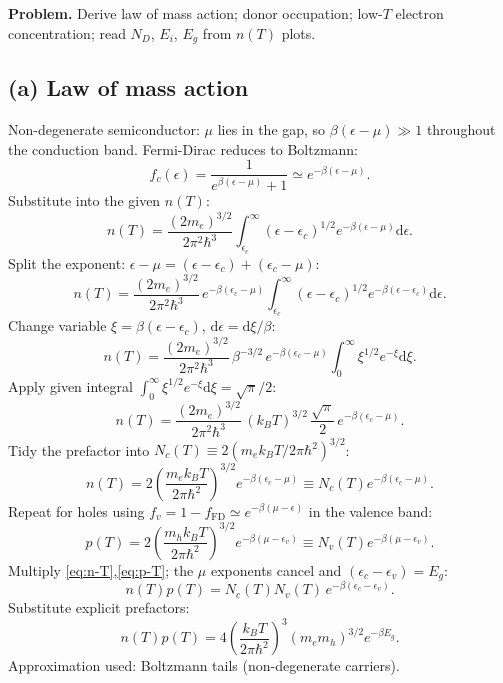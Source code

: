 \documentclass[11pt]{article}
\newcommand{\de}{\mathrm{d}}
\begin{document}
\textbf{Problem.} Derive law of mass action; donor occupation; low-$T$ electron concentration; read $N_D$, $E_i$, $E_g$ from $n(T)$ plots.

\subsection*{(a) Law of mass action}

Non-degenerate semiconductor: $\mu$ lies in the gap, so $\beta(\epsilon-\mu)\gg 1$ throughout the conduction band. Fermi-Dirac reduces to Boltzmann:
\[ f_c(\epsilon)=\frac{1}{e^{\beta(\epsilon-\mu)}+1}\simeq e^{-\beta(\epsilon-\mu)}. \]
Substitute into the given $n(T)$:
\[ n(T)=\frac{(2m_e)^{3/2}}{2\pi^2\hbar^3}\int_{\epsilon_c}^\infty(\epsilon-\epsilon_c)^{1/2}e^{-\beta(\epsilon-\mu)}\de\epsilon. \]
Split the exponent: $\epsilon-\mu=(\epsilon-\epsilon_c)+(\epsilon_c-\mu)$:
\[ n(T)=\frac{(2m_e)^{3/2}}{2\pi^2\hbar^3}\,e^{-\beta(\epsilon_c-\mu)}\int_{\epsilon_c}^\infty(\epsilon-\epsilon_c)^{1/2}e^{-\beta(\epsilon-\epsilon_c)}\de\epsilon. \]
Change variable $\xi=\beta(\epsilon-\epsilon_c)$, $\de\epsilon=\de\xi/\beta$:
\[ n(T)=\frac{(2m_e)^{3/2}}{2\pi^2\hbar^3}\,\beta^{-3/2}\,e^{-\beta(\epsilon_c-\mu)}\int_0^\infty\xi^{1/2}e^{-\xi}\de\xi. \]
Apply given integral $\int_0^\infty\xi^{1/2}e^{-\xi}\de\xi=\sqrt\pi/2$:
\[ n(T)=\frac{(2m_e)^{3/2}}{2\pi^2\hbar^3}\,(k_B T)^{3/2}\,\frac{\sqrt\pi}{2}\,e^{-\beta(\epsilon_c-\mu)}. \]
Tidy the prefactor into $N_c(T)\equiv 2(m_e k_B T/2\pi\hbar^2)^{3/2}$:
\begin{equation}
n(T)=2\!\left(\frac{m_e k_B T}{2\pi\hbar^2}\right)^{\!3/2}\!e^{-\beta(\epsilon_c-\mu)}\equiv N_c(T)e^{-\beta(\epsilon_c-\mu)}.
\label{eq:n-T}
\end{equation}
Repeat for holes using $f_v=1-f_{\text{FD}}\simeq e^{-\beta(\mu-\epsilon)}$ in the valence band:
\begin{equation}
p(T)=2\!\left(\frac{m_h k_B T}{2\pi\hbar^2}\right)^{\!3/2}\!e^{-\beta(\mu-\epsilon_v)}\equiv N_v(T)e^{-\beta(\mu-\epsilon_v)}.
\label{eq:p-T}
\end{equation}
Multiply \eqref{eq:n-T},\eqref{eq:p-T}; the $\mu$ exponents cancel and $(\epsilon_c-\epsilon_v)=E_g$:
\[ n(T)p(T)=N_c(T)N_v(T)\,e^{-\beta(\epsilon_c-\epsilon_v)}. \]
Substitute explicit prefactors:
\begin{equation}
\boxed{\;n(T)p(T)=4\!\left(\frac{k_B T}{2\pi\hbar^2}\right)^{\!3}\!(m_e m_h)^{3/2}e^{-\beta E_g}.\;}
\label{eq:mass-action}
\end{equation}
Approximation used: Boltzmann tails (non-degenerate carriers).
\end{document}
